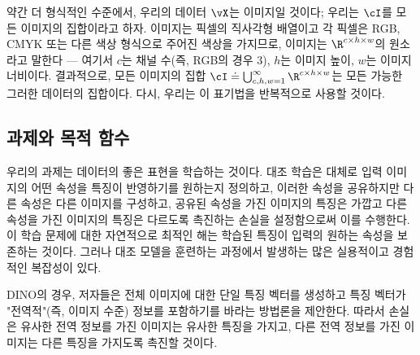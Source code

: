\documentclass[../../book-main_ko.tex]{subfiles}
\begin{document}
약간 더 형식적인 수준에서, 우리의 데이터 \(\vX\)는 이미지일 것이다; 우리는 \(\cI\)를 모든 이미지의 집합이라고 하자. 이미지는 픽셀의 직사각형 배열이고 각 픽셀은 RGB, CMYK 또는 다른 색상 형식으로 주어진 색상을 가지므로, 이미지는 \(\R^{c \times h \times w}\)의 원소라고 말한다 --- 여기서 \(c\)는 채널 수(즉, RGB의 경우 \(3\)), \(h\)는 이미지 높이, \(w\)는 이미지 너비이다. 결과적으로, 모든 이미지의 집합 \(\cI \doteq \bigcup_{c, h, w = 1}^{\infty}\R^{c \times h \times w}\)는 모든 가능한 그러한 데이터의 집합이다. 다시, 우리는 이 표기법을 반복적으로 사용할 것이다.

\subsection{과제와 목적 함수} \label{sub:contrastive_learning_objective}

우리의 과제는 데이터의 좋은 표현을 학습하는 것이다. 대조 학습은 대체로 입력 이미지의 어떤 속성을 특징이 반영하기를 원하는지 정의하고, 이러한 속성을 공유하지만 다른 속성은 다른 이미지를 구성하고, 공유된 속성을 가진 이미지의 특징은 가깝고 다른 속성을 가진 이미지의 특징은 다르도록 촉진하는 손실을 설정함으로써 이를 수행한다. 이 학습 문제에 대한 자연적으로 최적인 해는 학습된 특징이 입력의 원하는 속성을 보존하는 것이다. 그러나 대조 모델을 훈련하는 과정에서 발생하는 많은 실용적이고 경험적인 복잡성이 있다.

DINO의 경우, 저자들은 전체 이미지에 대한 단일 특징 벡터를 생성하고 특징 벡터가 "전역적"(즉, 이미지 수준) 정보를 포함하기를 바라는 방법론을 제안한다. 따라서 손실은 유사한 전역 정보를 가진 이미지는 유사한 특징을 가지고, 다른 전역 정보를 가진 이미지는 다른 특징을 가지도록 촉진할 것이다.
\end{document}
